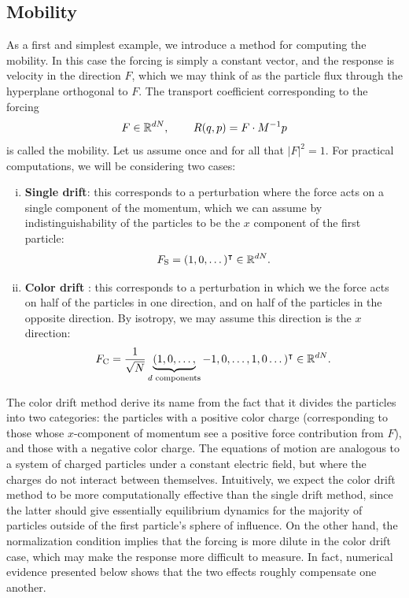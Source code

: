 \subsection{Mobility}\label{subsec:mobility}
As a first and simplest example, we introduce a method for computing the mobility. In this case the forcing is simply a constant vector, and the response is velocity in the direction $F$, which we may think of as the particle flux through the hyperplane orthogonal to $F$.
The transport coefficient corresponding to the forcing
\begin{equation}
    \label{eq:nemd_mobility_definitions}
    F\in \mathbb{R}^{dN},\,\qquad R(q,p)=F\cdot M^{-1}p
\end{equation}
is called the mobility.
Let us assume once and for all that $|F|^2=1$.
For practical computations, we will be considering two cases:
\begin{enumerate}[(i)]
    \item \textbf{Single drift}: this corresponds to a perturbation where the force acts on a single component of the momentum, which we can assume by indistinguishability of the particles to be the $x$ component of the first particle: \[F_{\mathrm{S}}=(1,0,\dots)^\intercal \in \mathbb{R}^{dN}.\]
    \item \textbf{Color drift} \cite[Chapter 6]{EM08}: this corresponds to a perturbation in which we the force acts on half of the particles in one direction, and on half of the particles in the opposite direction. By isotropy, we may assume this direction is the $x$ direction: \[F_{\mathrm{C}}=\frac1{\sqrt N}\underbrace{(1,0,\dots,}_{d \text{ components}}-1,0,\dots,1,0\dots)^\intercal \in \mathbb{R}^{dN}.\]
\end{enumerate}
The color drift method derive its name from the fact that it divides the particles into two categories: the particles with a positive color charge (corresponding to those whose $x$-component of momentum see a positive force contribution from $F$), and those with a negative color charge.
The equations of motion are analogous to a system of charged particles under a constant electric field, but where the charges do not interact between themselves.
Intuitively, we expect the color drift method to be more computationally effective than the single drift method, since the latter should give essentially equilibrium dynamics for the majority of particles outside of the first particle's sphere of influence.
On the other hand, the normalization condition implies that the forcing is more dilute in the color drift case, which may make the response more difficult to measure. In fact, numerical evidence presented below shows that the two effects roughly compensate one another.

